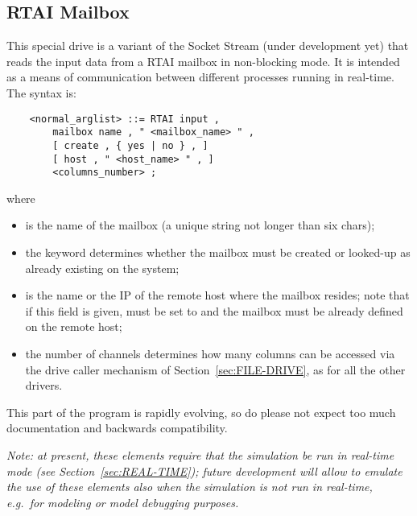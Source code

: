 \subsection{RTAI Mailbox}\label{sec:RTAI_in}
This special drive is a variant of the Socket Stream 
(under development yet) that reads the input data from a RTAI mailbox
in non-blocking mode.
It is intended as a means of communication between different processes
running in real-time.
The syntax is:
\begin{verbatim}
    <normal_arglist> ::= RTAI input ,
        mailbox name , " <mailbox_name> " ,
        [ create , { yes | no } , ]
        [ host , " <host_name> " , ]
        <columns_number> ;
\end{verbatim}
where
\begin{itemize}
\item {} is the name of the mailbox (a unique string 
not longer than six chars);
\item the  keyword determines whether the mailbox 
must be created or looked-up as already existing on the system;
\item {} is the name or the IP of the remote host where 
the mailbox resides; note that if this field is given,  must
be set to  and the mailbox must be already defined
on the remote host;
\item the number of channels  determines how many
columns can be accessed via the  drive caller mechanism 
of Section~\ref{sec:FILE-DRIVE}, as for all the other  drivers.
\end{itemize}
This part of the program is rapidly evolving, so do please not expect
too much documentation and backwards compatibility.

\emph{Note: at present, these elements require that the simulation
be run in real-time mode (see Section~\ref{sec:REAL-TIME});
future development will allow to emulate the use of these elements
also when the simulation is not run in real-time, e.g.\ for modeling
or model debugging purposes.}


